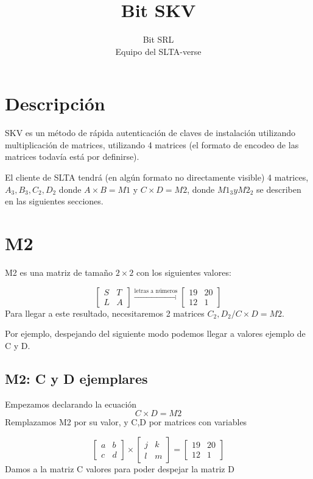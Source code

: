 \documentclass[11pt]{article}
\title{\textbf{Bit SKV}}
\author{Bit SRL\\
		Equipo del SLTA-verse}
\date{}
\begin{document}
\maketitle

\section{Descripción}
SKV es un método de rápida autenticación de claves de instalación utilizando multiplicación de matrices, utilizando 4 matrices (el formato de encodeo de las matrices todavía está por definirse).

El cliente de SLTA tendrá (en algún formato no directamente visible) 4 matrices, $ A_{3}, B_{3}, C_{2}, D_{2} $ donde $ A \times B = M1$ y $ C \times D = M2 $, donde $M1_{3} y M2_{2}$ se describen en las siguientes secciones.

\section{M2}
M2 es una matriz de tamaño $2\times2$ con los siguientes valores:

\[
\begin{bmatrix}
S & T \\
L & A
\end{bmatrix}
\xrightarrow{\text{letras a números}}
\begin{bmatrix}
19 & 20 \\
12 & 1
\end{bmatrix}
\]
Para llegar a este resultado, necesitaremos 2 matrices $C_{2}, D_{2} / C \times D = M2$.

Por ejemplo, despejando del siguiente modo podemos llegar a valores ejemplo de C y D.
\newpage
\subsection{M2: C y D ejemplares}
Empezamos declarando la ecuación
\[
C \times D = M2
\]
Remplazamos M2 por su valor, y C,D por matrices con variables

\[
\begin{bmatrix}
a & b \\
c & d
\end{bmatrix}
\times
\begin{bmatrix}
j & k \\
l & m
\end{bmatrix}
=
\begin{bmatrix}
19 & 20 \\
12 & 1
\end{bmatrix}
\]
Damos a la matriz C valores para poder despejar la matriz D
\end{document}
